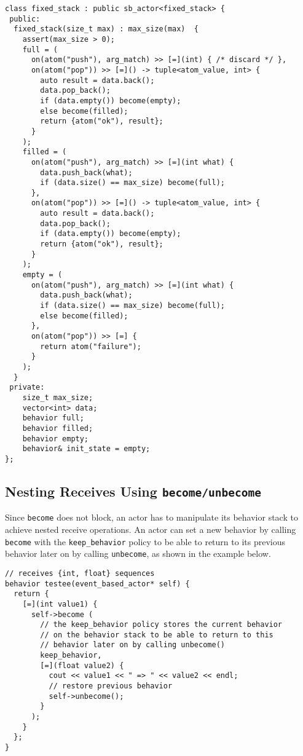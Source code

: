 \clearpage
\begin{lstlisting}
class fixed_stack : public sb_actor<fixed_stack> {
 public:
  fixed_stack(size_t max) : max_size(max)  {
    assert(max_size > 0);
    full = (
      on(atom("push"), arg_match) >> [=](int) { /* discard */ },
      on(atom("pop")) >> [=]() -> tuple<atom_value, int> {
        auto result = data.back();
        data.pop_back();
        if (data.empty()) become(empty);
        else become(filled);
        return {atom("ok"), result};
      }
    );
    filled = (
      on(atom("push"), arg_match) >> [=](int what) {
        data.push_back(what);
        if (data.size() == max_size) become(full);
      },
      on(atom("pop")) >> [=]() -> tuple<atom_value, int> {
        auto result = data.back();
        data.pop_back();
        if (data.empty()) become(empty);
        return {atom("ok"), result};
      }
    );
    empty = (
      on(atom("push"), arg_match) >> [=](int what) {
        data.push_back(what);
        if (data.size() == max_size) become(full);
        else become(filled);
      },
      on(atom("pop")) >> [=] {
        return atom("failure");
      }
    );
  }
 private:
    size_t max_size;
    vector<int> data;
    behavior full;
    behavior filled;
    behavior empty;
    behavior& init_state = empty;
};
\end{lstlisting}

\clearpage
\subsection{Nesting Receives Using \lstinline^become/unbecome^}

Since \lstinline^become^ does not block, an actor has to manipulate its behavior stack to achieve nested receive operations.
An actor can set a new behavior by calling \lstinline^become^ with the \lstinline^keep_behavior^ policy to be able to return to its previous behavior later on by calling \lstinline^unbecome^, as shown in the example below.

\begin{lstlisting}
// receives {int, float} sequences
behavior testee(event_based_actor* self) {
  return {
    [=](int value1) {
      self->become (
        // the keep_behavior policy stores the current behavior
        // on the behavior stack to be able to return to this
        // behavior later on by calling unbecome()
        keep_behavior,
        [=](float value2) {
          cout << value1 << " => " << value2 << endl;
          // restore previous behavior
          self->unbecome();
        }
      );
    }
  };
}
\end{lstlisting}

